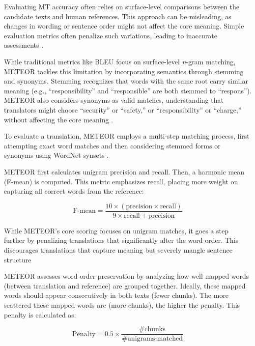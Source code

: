 {{Evaluating MT accuracy often relies on surface-level comparisons between the candidate texts and human references. This approach can be misleading, as changes in wording or sentence order might not affect the core meaning. Simple evaluation metrics often penalize such variations, leading to inaccurate assessments \parencite{koehn2020neural}.

While traditional metrics like BLEU focus on surface-level \emph{n}-gram matching, METEOR tackles this limitation by incorporating semantics through stemming and synonyms. Stemming recognizes that words with the same root carry similar meaning (e.g., ``responsibility'' and ``responsible'' are both stemmed to ``respons''). METEOR also considers synonyms as valid matches, understanding that translators might choose ``security'' or ``safety,'' or ``responsibility'' or ``charge,'' without affecting the core meaning \parencite{koehn2020neural}. 

To evaluate a translation, METEOR employs a multi-step matching process, first attempting exact word matches and then considering stemmed forms or synonyms using WordNet synsets \parencite{saadany-orasan-2021-bleu, pedersen-etal-2004-wordnet}.

METEOR first calculates unigram precision and recall. Then, a harmonic mean (F-mean) is computed. This metric emphasizes recall, placing more weight on capturing all correct words from the reference:

\begin{equation}
\text{F-mean} =  \frac{10 \times (\text{precision} \times \text{recall})}{9 \times \text{recall} + \text{precision}}
\end{equation} 

While METEOR's core scoring focuses on unigram matches, it goes a step further by penalizing translations that significantly alter the word order. This discourages translations that capture meaning but severely mangle sentence structure \parencite{banerjee-lavie-2005-meteor}

METEOR assesses word order preservation by analyzing how well mapped words (between translation and reference) are grouped together. Ideally, these mapped words should appear consecutively in both texts (fewer chunks). The more scattered these mapped words are (more chunks), the higher the penalty. This penalty is calculated as:

\begin{equation}
\text{Penalty} = 0.5 \times \frac{\text{\# chunks}}{\text{\# unigrams-matched}}
\end{equation} 

}}
